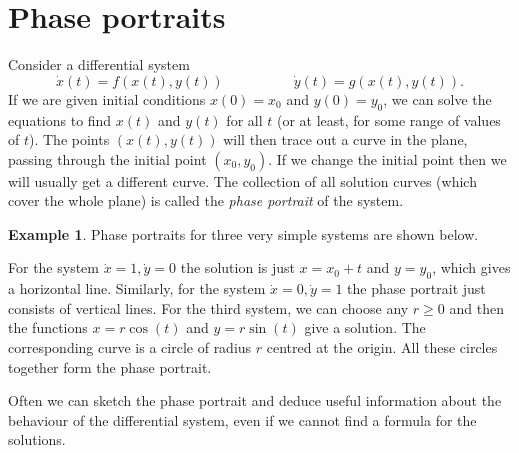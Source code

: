 \documentclass[reqno]{amsart}
\theoremstyle{definition}
\newtheorem{example}[theorem]{Example}
\begin{document}
\section{Phase portraits}

Consider a differential system 
\[ \dot{x}(t) = f(x(t),y(t)) \hspace{ 5em }
   \dot{y}(t) = g(x(t),y(t)).
\]
If we are given initial conditions $x(0)=x_0$ and $y(0)=y_0$, we can 
solve the equations to find $x(t)$ and $y(t)$ for all $t$ (or at
least, for some range of values of $t$).  The points $(x(t),y(t))$
will then trace out a curve in the plane, passing through the initial
point $(x_0,y_0)$.  If we change the initial point then we will
usually get a different curve.  The collection of all solution curves
(which cover the whole plane) is called the \emph{phase portrait} of
the system.  

\begin{example}
 Phase portraits for three very simple systems are shown below.
 \begin{center}
 \end{center}
 For the system $\dot{x}=1,\dot{y}=0$ the solution is just $x=x_0+t$
 and $y=y_0$, which gives a horizontal line.  Similarly, for the
 system $\dot{x}=0,\dot{y}=1$ the phase portrait just consists of
 vertical lines.  For the third system, we can choose any $r\geq 0$
 and then the functions $x=r\cos(t)$ and $y=r\sin(t)$ give a
 solution.  The corresponding curve is a circle of radius $r$ centred
 at the origin.  All these circles together form the phase portrait.
\end{example}

Often we can sketch the phase portrait and deduce useful information
about the behaviour of the differential system, even if we cannot find
a formula for the solutions.
\end{document}
